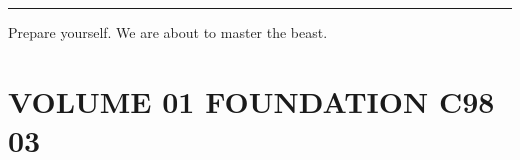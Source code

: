 \begin{center}\rule{0.5\linewidth}{0.5pt}\end{center}

Prepare yourself. We are about to master the beast.

\hypertarget{volume-01-foundation-c98-03}{%
\section{VOLUME 01 FOUNDATION C98
03}\label{volume-01-foundation-c98-03}}
